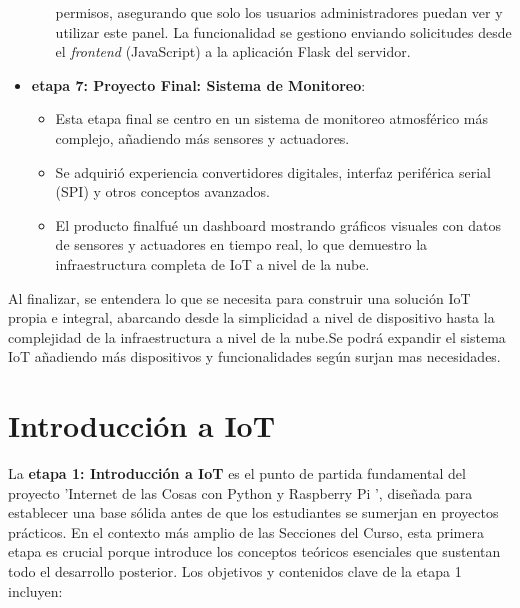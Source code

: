\documentclass{report}
\begin{document}
\begin{itemize}
\begin{itemize}
        permisos, asegurando que solo los usuarios administradores puedan ver y utilizar este panel. La funcionalidad se gestiono 
        enviando solicitudes desde el \textit{frontend} (JavaScript) a la aplicación Flask del servidor.
    \end{itemize}
    \item \textbf{etapa 7: Proyecto Final: Sistema de Monitoreo}:
    \begin{itemize}
        \item Esta etapa final se centro en un sistema de monitoreo atmosférico más complejo, añadiendo más sensores y actuadores.
        \item Se adquirió experiencia convertidores digitales, interfaz periférica serial (SPI) y otros conceptos avanzados.
        \item El producto finalfué un dashboard mostrando gráficos visuales con datos de sensores y actuadores en tiempo real, lo que 
        demuestro la infraestructura completa de IoT a nivel de la nube.
    \end{itemize}
\end{itemize}
Al finalizar, se entendera lo que se necesita para construir una solución IoT propia e integral, abarcando desde la simplicidad a nivel 
de dispositivo hasta la complejidad de la infraestructura a nivel de la nube.Se podrá expandir el sistema IoT añadiendo más dispositivos 
y funcionalidades según surjan mas necesidades.

\section{Introducción a IoT}
La \textbf{etapa 1: Introducción a IoT} es el punto de partida fundamental del proyecto  'Internet de las Cosas con Python y Raspberry Pi ', diseñada 
para establecer una base sólida antes de que los estudiantes se sumerjan en proyectos prácticos. En el contexto más amplio de las Secciones del Curso, 
esta primera etapa es crucial porque introduce los conceptos teóricos esenciales que sustentan todo el desarrollo posterior. 
Los objetivos y contenidos clave de la etapa 1 incluyen:
\end{document}

